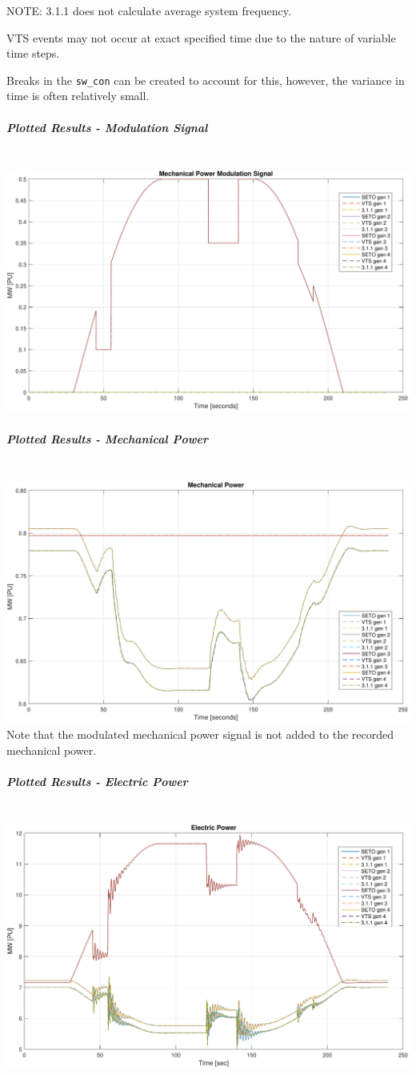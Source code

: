 \documentclass[12pt]{article}
\begin{document}
NOTE: 3.1.1 does not calculate average system frequency.

VTS events may not occur at exact specified time due to the nature of variable time steps.

Breaks in the \verb|sw_con| can be created to account for this, however, the variance in time is often relatively small.


\pagebreak
\subparagraph{Plotted Results - Modulation Signal} \ \\
\includegraphics[width=\linewidth]{verPmSig}
\subparagraph{Plotted Results - Mechanical Power} \ \\
\includegraphics[width=\linewidth]{verPmech}
Note that the modulated mechanical power signal is not added to the recorded mechanical power.
\subparagraph{Plotted Results - Electric Power} \ \\
\includegraphics[width=\linewidth]{verPelect}
\end{document}
